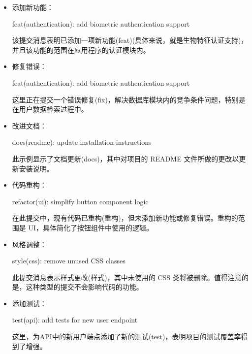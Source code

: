 \begin{itemize}
\item
添加新功能：

\begin{shell}
feat(authentication): add biometric authentication support
\end{shell}

该提交消息表明已添加一项新功能(feat)(具体来说，就是生物特征认证支持)，并且该功能的范围在应用程序的认证模块内。

\item
修复错误：

\begin{shell}
feat(authentication): add biometric authentication support
\end{shell}

这里正在提交一个错误修复(fix)，解决数据库模块内的竞争条件问题，特别是在用户数据检索过程中。

\item
改进文档：

\begin{shell}
docs(readme): update installation instructions
\end{shell}

此示例显示了文档更新(docs)，其中对项目的 README 文件所做的更改以更新安装说明。

\item
代码重构：

\begin{shell}
refactor(ui): simplify button component logic
\end{shell}

在此提交中，现有代码已重构(重构)，但未添加新功能或修复错误。重构的范围是 UI，具体简化了按钮组件中使用的逻辑。

\item
风格调整：

\begin{shell}
style(css): remove unused CSS classes
\end{shell}

此提交消息表示样式更改(样式)，其中未使用的 CSS 类将被删除。值得注意的是，这种类型的提交不会影响代码的功能。

\item
添加测试：

\begin{shell}
test(api): add tests for new user endpoint
\end{shell}

这里，为API中的新用户端点添加了新的测试(test)，表明项目的测试覆盖率得到了增强。


\end{itemize}
